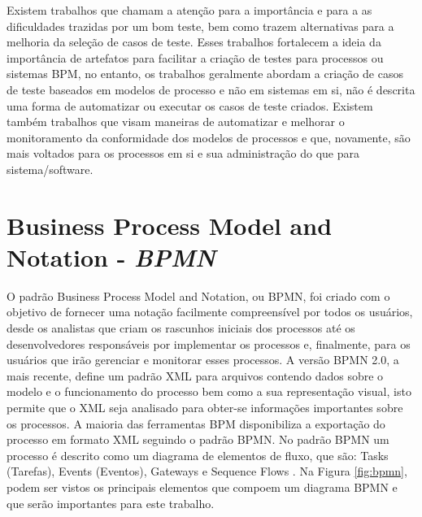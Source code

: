 \documentclass[12pt]{article}
\begin{document}
Existem trabalhos que chamam a atenção para a importância e para a as dificuldades trazidas por um bom teste, bem como trazem alternativas para a melhoria da seleção de casos de teste\cite{bohmer2015genetic}. Esses trabalhos fortalecem a ideia da importância de artefatos para facilitar a criação de testes para processos ou sistemas BPM, no entanto, os trabalhos geralmente abordam a criação de casos de teste baseados em modelos de processo e não em sistemas em si, não é descrita uma forma de automatizar ou executar os casos de teste criados. Existem também trabalhos que visam maneiras de automatizar e melhorar o monitoramento da conformidade dos modelos de processos \cite{ly2015compliance,van2012replaying} e que, novamente, são mais voltados para os processos em si e sua administração do que para sistema/software.

\section{Business Process Model and Notation - \emph{BPMN}}
O padrão Business Process Model and Notation, ou BPMN, foi criado com o objetivo de fornecer uma notação facilmente compreensível por todos os usuários, desde os analistas que criam os rascunhos iniciais dos processos até os desenvolvedores responsáveis por implementar os processos e, finalmente, para os usuários que irão gerenciar e monitorar esses processos\cite{model2011notation}. A versão BPMN 2.0, a mais recente, define um padrão XML para arquivos contendo dados sobre o modelo e o funcionamento do processo bem como a sua representação visual\cite{kurzdiagram}, isto permite que o XML seja analisado para obter-se informações importantes sobre os processos. A maioria das ferramentas BPM disponibiliza a exportação do processo em formato XML seguindo o padrão BPMN. No padrão BPMN um processo é descrito como um diagrama de elementos de fluxo, que são: Tasks (Tarefas), Events (Eventos), Gateways e Sequence Flows \cite{kurzdiagram}. Na Figura \ref{fig:bpmn}, podem ser vistos os principais elementos que compoem um diagrama BPMN e que serão importantes para este trabalho.

\end{document}
